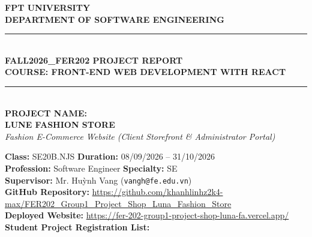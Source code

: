 \documentclass[12pt,a4paper,oneside]{report}
\begin{document}

\begin{titlepage}
    \centering
    \vspace*{0.3cm}
    {\Large \textbf{FPT UNIVERSITY}}\\[0.25cm]
    {\large \textbf{DEPARTMENT OF SOFTWARE ENGINEERING}}\\[1.0cm]

    \rule{\linewidth}{0.8mm} \\[0.4cm]
    {\Huge \bfseries \textcolor{PrimaryBrown}{FALL2026\_FER202 PROJECT REPORT}}\\[0.3cm]
    {\LARGE \bfseries COURSE: FRONT-END WEB DEVELOPMENT WITH REACT}\\[0.2cm]
    \rule{\linewidth}{0.8mm} \\[0.9cm]

    {\Large \textbf{PROJECT NAME:}}\\[0.25cm]
    {\Huge \bfseries \textcolor{PrimaryBrown}{LUNE FASHION STORE}}\\[0.25cm]
    {\large \textit{Fashion E-Commerce Website (Client Storefront \& Administrator Portal)}}\\[1.0cm]

    \begin{flushleft}
    \textbf{Class:} SE20B.NJS \hfill \textbf{Duration:} 08/09/2026 -- 31/10/2026\\
    \textbf{Profession:} Software Engineer \hfill \textbf{Specialty:} SE\\
    \textbf{Supervisor:} Mr. Huỳnh Vang (\texttt{vangh@fe.edu.vn})\\
    \textbf{GitHub Repository:} \url{https://github.com/khanhlinhz2k4-max/FER202_Group1_Project_Shop_Luna_Fashion_Store}\\
    \textbf{Deployed Website:} \url{https://fer-202-group1-project-shop-luna-fa.vercel.app/}\\[0.4cm]
    \textbf{Student Project Registration List:}
    \end{flushleft}


\end{titlepage}
\end{document}
